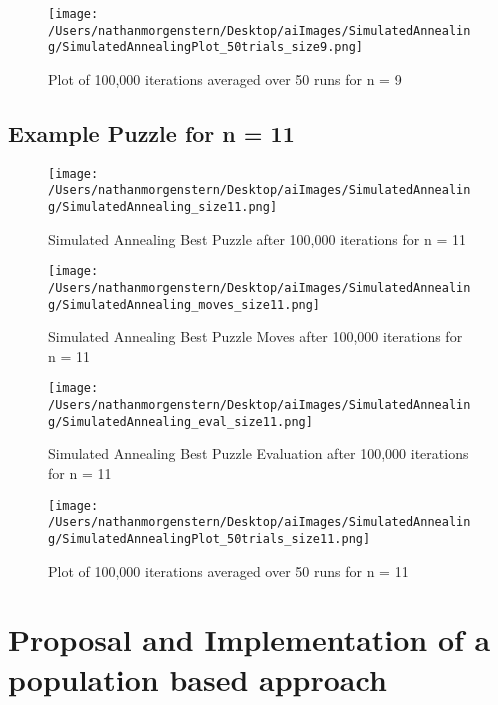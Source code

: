 \documentclass{report}
\begin{document}
	\begin{figure}[H]
	\centering
	\texttt{[image: /Users/nathanmorgenstern/Desktop/aiImages/SimulatedAnnealing/SimulatedAnnealingPlot\_50trials\_size9.png]}
	\caption{Plot of 100,000 iterations averaged over 50 runs for n = 9}
	\label{fig: Plot of 100,000 iterations averaged over 50 runs for n = 9}
	\end{figure}

\subsection{Example Puzzle for n = 11}
	\begin{figure}[H]
	\centering
	\texttt{[image: /Users/nathanmorgenstern/Desktop/aiImages/SimulatedAnnealing/SimulatedAnnealing\_size11.png]}
	\caption{Simulated Annealing Best Puzzle after 100,000 iterations for n = 11} 
	\label{fig: Simulated Annealing Best Puzzle after 100,000 iterations for n = 11}
	\end{figure}
	
	\begin{figure}[H]
	\centering
	\texttt{[image: /Users/nathanmorgenstern/Desktop/aiImages/SimulatedAnnealing/SimulatedAnnealing\_moves\_size11.png]}
	\caption{Simulated Annealing Best Puzzle Moves after 100,000 iterations for n = 11} 
	\label{fig: Simulated Annealing Best Puzzle Moves after 100,000 iterations for n = 11}
	\end{figure}

	\begin{figure}[H]
	\centering
	\texttt{[image: /Users/nathanmorgenstern/Desktop/aiImages/SimulatedAnnealing/SimulatedAnnealing\_eval\_size11.png]}
	\caption{Simulated Annealing Best Puzzle Evaluation after 100,000 iterations for n = 11} 
	\label{fig: Simulated Annealing Best Puzzle Evaluation after 100,000 iterations for n = 11} 
	\end{figure}

	\begin{figure}[H]
	\centering
	\texttt{[image: /Users/nathanmorgenstern/Desktop/aiImages/SimulatedAnnealing/SimulatedAnnealingPlot\_50trials\_size11.png]}
	\caption{Plot of 100,000 iterations averaged over 50 runs for n = 11}
	\label{fig: Plot of 100,000 iterations averaged over 50 runs for n = 11}
	\end{figure}

\newpage
\section{Proposal and Implementation of a population based approach}
\end{document}
